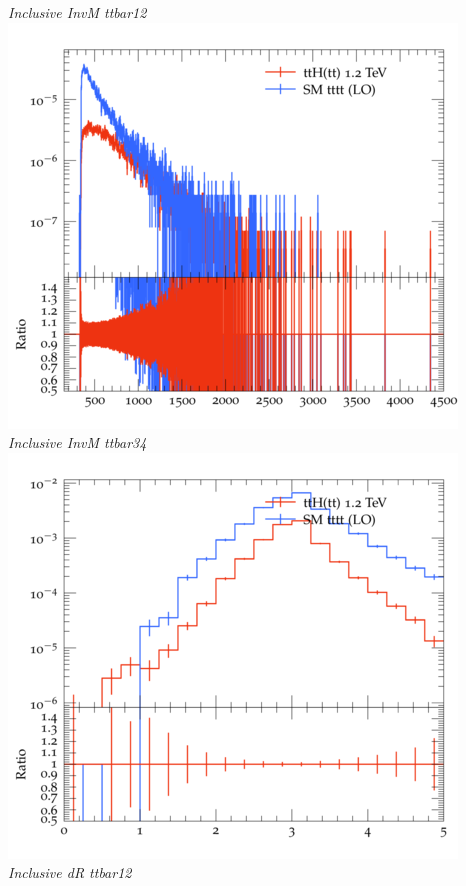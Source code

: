 \documentclass{beamer}
\begin{document}
\begin{frame}
\begin{columns}
\textit{\small Inclusive InvM ttbar12}
\includegraphics[width=\textwidth]{../plots/ttH_1200/tttt_ttH/Inclusive_InvM_ttbar34.png}\\
\textit{\small Inclusive InvM ttbar34}
\includegraphics[width=\textwidth]{../plots/ttH_1200/tttt_ttH/Inclusive_dR_ttbar12.png}\\
\textit{\small Inclusive dR ttbar12}
\end{columns}
\end{frame}
\end{document}
